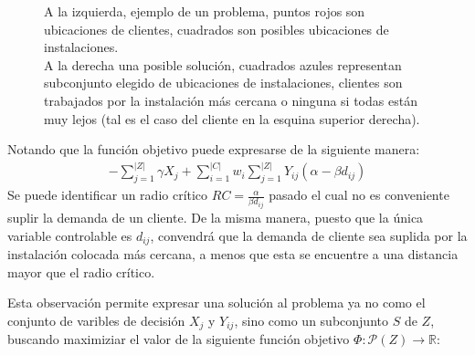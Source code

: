 \documentclass{article}
\begin{document}
\begin{figure}%
    \centering
    \qquad \qquad \qquad
    \caption{A la izquierda, ejemplo de un problema, puntos rojos son ubicaciones de clientes, cuadrados son posibles ubicaciones de instalaciones.\\ A la derecha una posible solución, cuadrados azules representan subconjunto elegido de ubicaciones de instalaciones, clientes son trabajados por la instalación más cercana o ninguna si todas están muy lejos (tal es el caso del cliente en la esquina superior derecha).}
    \label{fig:problem}
\end{figure}

Notando que la función objetivo puede expresarse de la siguiente manera:
\begin{align*}
    -\sum_{j=1}^{|Z|} \gamma X_{j} + \sum_{i=1}^{|C|} w_i \sum_{j=1}^{|Z|} Y_{ij} (\alpha - \beta d_{ij})
\end{align*}
Se puede identificar un radio crítico $RC = \frac{\alpha}{\beta d_{ij}}$ pasado el cual no es conveniente suplir la demanda de un cliente. De la misma manera, puesto que la única variable controlable es $d_{ij}$, convendrá que la demanda de cliente sea suplida por la instalación colocada más cercana, a menos que esta se encuentre a una distancia mayor que el radio crítico.

Esta observación permite expresar una solución al problema ya no como el conjunto de varibles de decisión $X_{j}$ y $Y_{ij}$, sino como un subconjunto $S$ de $Z$, buscando maximiziar el valor de la siguiente función objetivo $\Phi : \mathcal{P}(Z) \rightarrow \mathbb{R}$:
\end{document}
